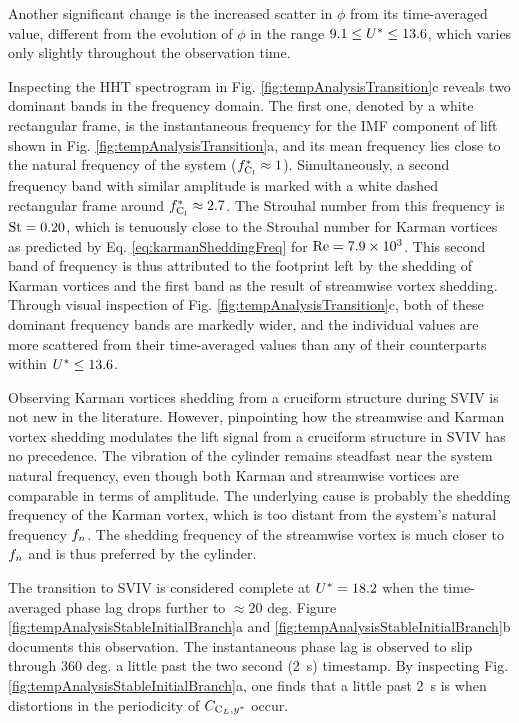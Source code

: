 \documentclass[oneside]{utmthesis}
\begin{document}
\noindent Another significant change is the increased scatter in $\phi$ from its time-averaged value, different from the evolution of $\phi$ in the range $9.1 \leq U^{*} \leq 13.6$, which varies only slightly throughout the observation time.

Inspecting the HHT spectrogram in Fig. \ref{fig:tempAnalysisTransition}c reveals two dominant bands in the frequency domain. The first one, denoted by a white rectangular frame, is the instantaneous frequency for the IMF component of lift shown in Fig. \ref{fig:tempAnalysisTransition}a, and its mean frequency lies close to the natural frequency of the system ($f_{\text{C}_{l}}^{*} \approx 1$). Simultaneously, a second frequency band with similar amplitude is marked with a white dashed rectangular frame around $f_{\text{C}_{l}}^{*} \approx 2.7$. The Strouhal number from this frequency is $\text{St} = 0.20$, which is tenuously close to the Strouhal number for Karman vortices as predicted by Eq. \ref{eq:karmanSheddingFreq} for $\text{Re} = 7.9 \times 10^{3}$. This second band of frequency is thus attributed to the footprint left by the shedding of Karman vortices and the first band as the result of streamwise vortex shedding. Through visual inspection of Fig. \ref{fig:tempAnalysisTransition}c, both of these dominant frequency bands are markedly wider, and the individual values are more scattered from their time-averaged values than any of their counterparts within $U^{*} \leq 13.6$.

Observing Karman vortices shedding from a cruciform structure during SVIV is not new in the literature. However, pinpointing how the streamwise and Karman vortex shedding modulates the lift signal from a cruciform structure in SVIV has no precedence. The vibration of the cylinder remains steadfast near the system natural frequency, even though both Karman and streamwise vortices are comparable in terms of amplitude. The underlying cause is probably the shedding frequency of the Karman vortex, which is too distant from the system's natural frequency $f_{n}$. The shedding frequency of the streamwise vortex is much closer to $f_{n}$ and is thus preferred by the cylinder.

The transition to SVIV is considered complete at $U^{*} = 18.2$ when the time-averaged phase lag drops further to $\approx 20$ deg. Figure \ref{fig:tempAnalysisStableInitialBranch}a and \ref{fig:tempAnalysisStableInitialBranch}b documents this observation. The instantaneous phase lag is observed to slip through 360 deg. a little past the two second (\SI{2}{\second}) timestamp. By inspecting Fig. \ref{fig:tempAnalysisStableInitialBranch}a, one finds that a little past \SI{2}{\second} is when distortions in the periodicity of $C_{\text{C}_{L},y^{*}}$ occur.
\end{document}
